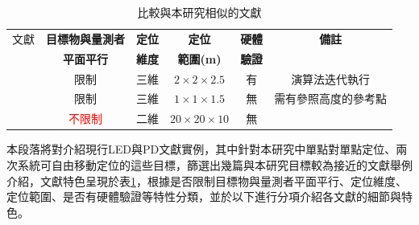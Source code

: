     \begin{table}[htpb]
        \begin{center}
          \caption{比較與本研究相似的文獻}
          \label{tab:LEDPD_case}
          \begin{tabular}{c||c|c|c|c|c} 

             文獻 &
              \textbf{目標物與量測者}&
              \textbf{定位}&
              \textbf{定位}& 
              \textbf{硬體}&
              \textbf{備註}\\

             & \textbf{平面平行}&\textbf{維度}&\textbf{範圍(m)}&\textbf{驗證} &\\
            \hline
            
            
            \cite{case:3d_layers}&
            限制&
            三維&
            $2\times 2\times 2.5$&
            有&
            演算法迭代執行\\
            
            \cite{case:cart3d}&
            限制&
            三維&
            $1\times 1\times 1.5$&
            無&
            需有參照高度的參考點\\

            \cite{omg_new}&
            \textcolor{red}{不限制}&
            二維&
            $20\times 20\times 10$&
            無&
            \\
          \end{tabular}
        \end{center}
      \end{table}

      本段落將對介紹現行LED與PD文獻實例，其中針對本研究中單點對單點定位、兩次系統可自由移動定位的這些目標，篩選出幾篇與本研究目標較為接近的文獻舉例介紹，文獻特色呈現於表\ref{tab:LEDPD_case}，根據是否限制目標物與量測者平面平行、定位維度、定位範圍、是否有硬體驗證等特性分類，並於以下進行分項介紹各文獻的細節與特色。

